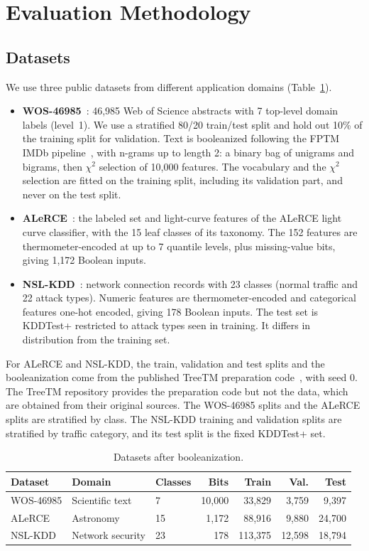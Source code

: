 \documentclass[preprint,review,12pt]{elsarticle}
\begin{document}
\section{Evaluation Methodology}\label{sec:method}    
\subsection{Datasets}
We use three public datasets from different application domains (Table~\ref{tab:datasets}).
\begin{itemize}
\item \textbf{WOS-46985}~\cite{kowsari2017hdltex}: 46,985 Web of Science abstracts with 7 top-level domain labels (level~1).
We use a stratified 80/20 train/test split and hold out 10\% of the training split for validation.
Text is booleanized following the FPTM IMDb pipeline~\cite{hnilov2025code}, with n-grams up to length 2: a binary bag of unigrams and bigrams, then $\chi^2$ selection of 10,000 features.
The vocabulary and the $\chi^2$ selection are fitted on the training split, including its validation part, and never on the test split.
\item \textbf{ALeRCE}~\cite{sanchezsaez2021alerce}: the labeled set and light-curve features of the ALeRCE light curve classifier, with the 15 leaf classes of its taxonomy. The 152 features are thermometer-encoded at up to 7 quantile levels, plus missing-value bits, giving 1,172 Boolean inputs.
\item \textbf{NSL-KDD}~\cite{tavallaee2009nslkdd}: network connection records with 23 classes (normal traffic and 22 attack types). Numeric features are thermometer-encoded and categorical features one-hot encoded, giving 178 Boolean inputs. The test set is KDDTest+ restricted to attack types seen in training. It differs in distribution from the training set.
\end{itemize}
For ALeRCE and NSL-KDD, the train, validation and test splits and the booleanization come from the published TreeTM preparation code~\cite{treetm2026repo}, with seed 0. The TreeTM repository provides the preparation code but not the data, which are obtained from their original sources.
The WOS-46985 splits and the ALeRCE splits are stratified by class. The NSL-KDD training and validation splits are stratified by traffic category, and its test split is the fixed KDDTest+ set.

\begin{table}[!htbp]
\small
\centering
\caption{Datasets after booleanization.}
\label{tab:datasets}
\begin{tabular}{lllrrrr}
\toprule
Dataset & Domain & Classes & Bits & Train & Val. & Test \\
\midrule
WOS-46985 & Scientific text & 7 & 10,000 & 33,829 & 3,759 & 9,397 \\
ALeRCE & Astronomy & 15 & 1,172 & 88,916 & 9,880 & 24,700 \\
NSL-KDD & Network security & 23 & 178 & 113,375 & 12,598 & 18,794 \\
\bottomrule
\end{tabular}
\end{table}
\end{document}
